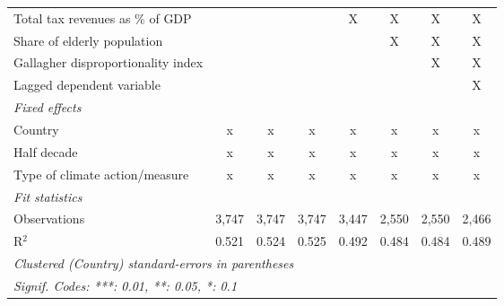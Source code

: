 \begin{tabular}{lccccccc}
   Total tax revenues as \% of GDP                                                         &                &               &               & X             & X            & X            & X\\  
   Share of elderly population                                                             &                &               &               &               & X            & X            & X\\  
   Gallagher disproportionality index                                                      &                &               &               &               &              & X            & X\\  
   Lagged dependent variable                                                               &                &               &               &               &              &              & X\\  
   \emph{Fixed effects}\\
   Country                                                                                 & x              & x             & x             & x             & x            & x            & x\\  
   Half decade                                                                             & x              & x             & x             & x             & x            & x            & x\\  
   Type of climate action/measure                                                          & x              & x             & x             & x             & x            & x            & x\\  
   \midrule \emph{Fit statistics}\\
   Observations                                                                            & 3,747          & 3,747         & 3,747         & 3,447         & 2,550        & 2,550        & 2,466\\  
   R$^2$                                                                                   & 0.521          & 0.524         & 0.525         & 0.492         & 0.484        & 0.484        & 0.489\\  
   \midrule
   \multicolumn{8}{l}{\emph{Clustered (Country) standard-errors in parentheses}}\\
   \multicolumn{8}{l}{\emph{Signif. Codes: ***: 0.01, **: 0.05, *: 0.1}}\\
\end{tabular}
\par\endgroup


